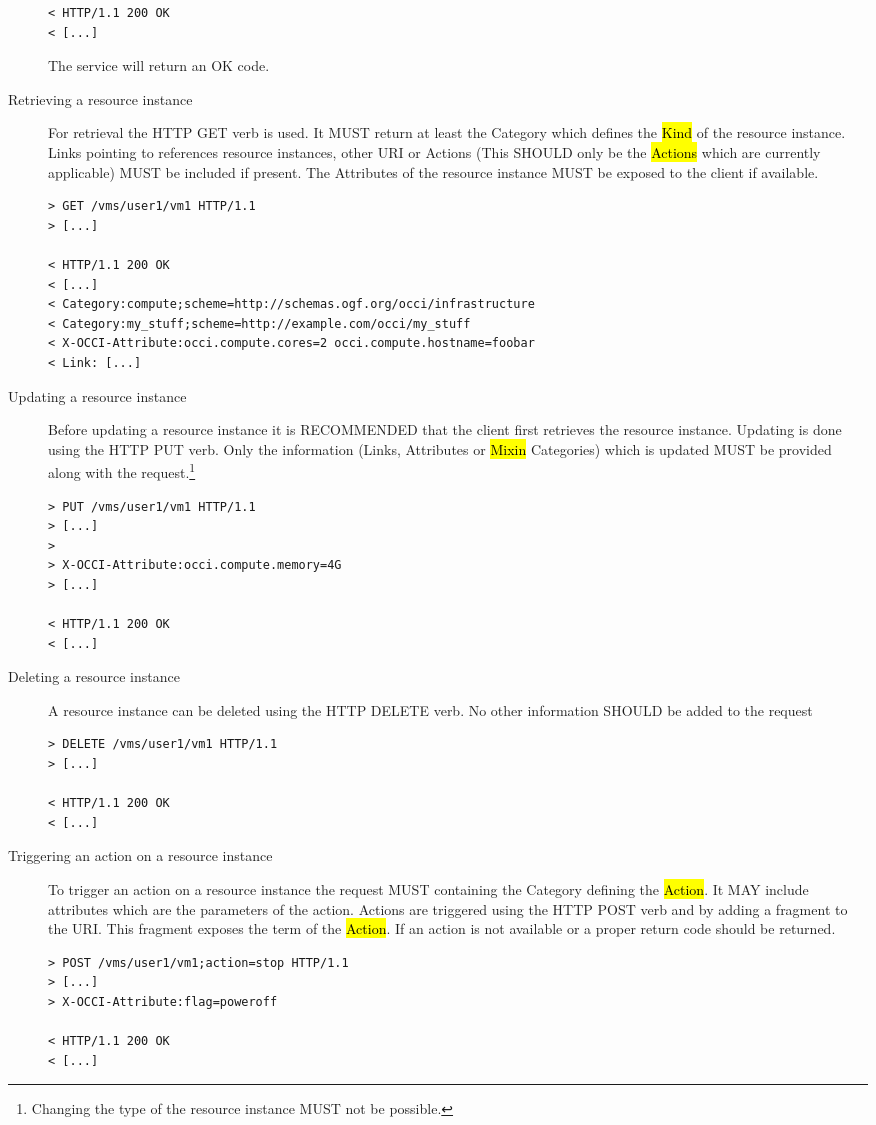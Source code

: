 \documentclass[10pt,a4paper]{article}
\begin{document}
\begin{description}
\begin{verbatim}
< HTTP/1.1 200 OK
< [...]
\end{verbatim}
  The service will return an OK code.

\item[Retrieving a resource instance] For retrieval the HTTP GET verb
  is used. It MUST return at least the Category which defines the
  \hl{Kind} of the resource instance. Links pointing to references
  resource instances, other URI or Actions (This SHOULD only be the
  \hl{Actions} which are currently applicable) MUST be included if
  present. The Attributes of the resource instance MUST be exposed to
  the client if available.
\begin{verbatim}
> GET /vms/user1/vm1 HTTP/1.1
> [...]
 
< HTTP/1.1 200 OK
< [...]
< Category:compute;scheme=http://schemas.ogf.org/occi/infrastructure
< Category:my_stuff;scheme=http://example.com/occi/my_stuff
< X-OCCI-Attribute:occi.compute.cores=2 occi.compute.hostname=foobar
< Link: [...]
\end{verbatim}

\item[Updating a resource instance] Before updating a resource
  instance it is RECOMMENDED that the client first retrieves the
  resource instance. Updating is done using the HTTP PUT verb. Only
  the information (Links, Attributes or \hl{Mixin} Categories) which
  is updated MUST be provided along with the
  request.\footnote{Changing the type of the resource instance MUST
    not be possible.}
\begin{verbatim}
> PUT /vms/user1/vm1 HTTP/1.1
> [...]
> 
> X-OCCI-Attribute:occi.compute.memory=4G
> [...]
 
< HTTP/1.1 200 OK
< [...]
\end{verbatim}

\item[Deleting a resource instance] A resource instance can be deleted
  using the HTTP DELETE verb. No other information SHOULD be added to
  the request
\begin{verbatim}
> DELETE /vms/user1/vm1 HTTP/1.1
> [...]

< HTTP/1.1 200 OK
< [...]
\end{verbatim}

\item[Triggering an action on a resource instance] To trigger an
  action on a resource instance the request MUST containing the Category
  defining the \hl{Action}. It MAY include attributes which are the
  parameters of the action. Actions are triggered using the HTTP POST
  verb and by adding a fragment to the URI. This fragment exposes the
  term of the \hl{Action}. If an action is not available or a proper
  return code should be returned.
\begin{verbatim}
> POST /vms/user1/vm1;action=stop HTTP/1.1
> [...]
> X-OCCI-Attribute:flag=poweroff

< HTTP/1.1 200 OK
< [...]
\end{verbatim}
\end{description}
\end{document}
